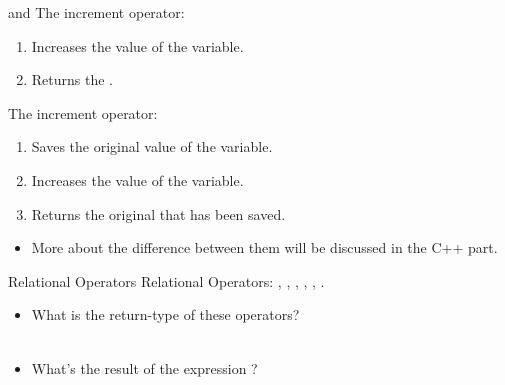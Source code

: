 \documentclass[handout]{beamer}
\begin{document}
\begin{frame}[fragile]{\ttt{++} and \ttt{--}}
    The  increment operator:
    \begin{enumerate}
        \item Increases the value of the variable.
        \item Returns the .
    \end{enumerate}
    \pause
    The  increment operator:
    \begin{enumerate}
        \item Saves the original value of the variable.
        \item Increases the value of the variable.
        \item Returns the original  that has been saved.
    \end{enumerate}
    \pause
    \begin{itemize}
        \item More about the difference between them will be discussed in the C++ part.
    \end{itemize}
\end{frame}

\begin{frame}{Relational Operators}
    Relational Operators: \ttt{<}, \ttt{<=}, \ttt{>}, \ttt{>=}, \redtt{==}, \ttt{!=}.
    \begin{itemize}
        \item What is the return-type of these operators?\\
        \pause
        \\
        \pause
        \item What's the result of the expression ?\\
        \pause
    \end{itemize}
\end{frame}
\end{document}
